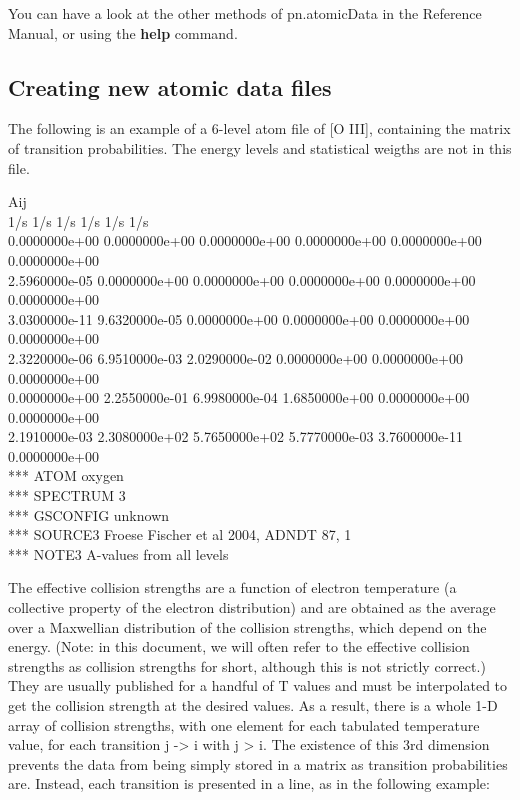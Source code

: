 \documentclass{report}
\begin{document}
    You can have a look at the other methods of pn.atomicData in the
Reference Manual, or using the \textbf{help} command.


    \subsection{Creating new atomic data files}


    The following is an example of a 6-level atom file of {[}O III{]},
containing the matrix of transition probabilities. The energy levels and
statistical weigths are not in this file.

    Aij\\1/s 1/s 1/s 1/s 1/s 1/s\\0.0000000e+00 0.0000000e+00 0.0000000e+00
0.0000000e+00 0.0000000e+00 0.0000000e+00\\2.5960000e-05 0.0000000e+00
0.0000000e+00 0.0000000e+00 0.0000000e+00 0.0000000e+00\\3.0300000e-11
9.6320000e-05 0.0000000e+00 0.0000000e+00 0.0000000e+00
0.0000000e+00\\2.3220000e-06 6.9510000e-03 2.0290000e-02 0.0000000e+00
0.0000000e+00 0.0000000e+00\\0.0000000e+00 2.2550000e-01 6.9980000e-04
1.6850000e+00 0.0000000e+00 0.0000000e+00\\2.1910000e-03 2.3080000e+02
5.7650000e+02 5.7770000e-03 3.7600000e-11 0.0000000e+00\\*** ATOM
oxygen\\*** SPECTRUM 3\\*** GSCONFIG unknown\\*** SOURCE3 Froese Fischer
et al 2004, ADNDT 87, 1\\*** NOTE3 A-values from all levels

    The effective collision strengths are a function of electron temperature
(a collective property of the electron distribution) and are obtained as
the average over a Maxwellian distribution of the collision strengths,
which depend on the energy. (Note: in this document, we will often refer
to the effective collision strengths as collision strengths for short,
although this is not strictly correct.) They are usually published for a
handful of T values and must be interpolated to get the collision
strength at the desired values. As a result, there is a whole 1-D array
of collision strengths, with one element for each tabulated temperature
value, for each transition j -\textgreater{} i with j \textgreater{} i.
The existence of this 3rd dimension prevents the data from being simply
stored in a matrix as transition probabilities are. Instead, each
transition is presented in a line, as in the following example:
\end{document}
